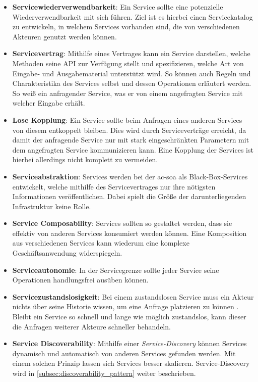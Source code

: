     \begin{itemize}
        \item \textbf{Servicewiederverwendbarkeit}: Ein Service sollte eine potenzielle Wiederverwendbarkeit mit sich führen. Ziel ist es hierbei einen Servicekatalog zu entwickeln, in welchem Services vorhanden sind, die von verschiedenen Akteuren genutzt werden können.
        \clearpage
        
        \item \textbf{Servicevertrag}: Mithilfe eines Vertrages kann ein Service darstellen, welche Methoden seine API zur Verfügung stellt und spezifizieren, welche Art von Eingabe- und Ausgabematerial unterstützt wird. So können auch Regeln und Charakteristika des Services selbst und dessen Operationen erläutert werden. So weiß ein anfragender Service, was er von einem angefragten Service mit welcher Eingabe erhält.
        
        \item \textbf{Lose Kopplung}: Ein Service sollte beim Anfragen eines anderen Services von diesem entkoppelt bleiben. Dies wird durch Serviceverträge erreicht, da damit der anfragende Service nur mit stark eingeschränkten Parametern mit dem angefragten Service kommunizieren kann. Eine Kopplung der Services ist hierbei allerdings nicht komplett zu vermeiden.
        
        \item \textbf{Serviceabstraktion}: Services werden bei der \gls{ac-soa} als Black-Box-Services entwickelt, welche mithilfe des Servicevertrages nur ihre nötigsten Informationen veröffentlichen. Dabei spielt die Größe der darunterliegenden Infrastruktur keine Rolle.
        
        \item \textbf{Service Composability}: Services sollten so gestaltet werden, dass sie effektiv von anderen Services konsumiert werden können. Eine Komposition aus verschiedenen Services kann wiederum eine komplexe Geschäftsanwendung widerspiegeln.
        
        \item \textbf{Serviceautonomie}: In der Servicegrenze sollte jeder Service seine Operationen handlungsfrei ausüben können.
        
        \item \textbf{Servicezustandslosigkeit}: Bei einem zustandslosen Service \glqq muss ein Akteur nichts über seine Historie wissen, um eine Anfrage platzieren zu können\grqq{} \parencite[S. 13]{takai2017architektur}. Bleibt ein Service so schnell und lange wie möglich zustandslos, kann dieser die Anfragen weiterer Akteure schneller behandeln.
        
        \item \textbf{Service Discoverability}: Mithilfe einer \emph{Service-Discovery} können Services dynamisch und automatisch von anderen Services gefunden werden. Mit einem solchen Prinzip lassen sich Services besser skalieren. Service-Discovery wird in \autoref{subsec:discoverability_pattern} weiter beschrieben.
    \end{itemize}
    \parencites[S. 13--14]{takai2017architektur}{erl2005soa}

